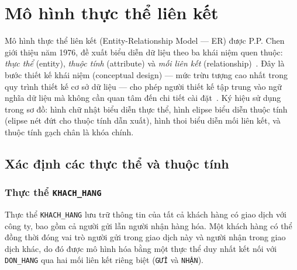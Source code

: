 \documentclass[11pt]{report}
\begin{document}

\chapter{Mô hình thực thể liên kết}
\label{chap:erd}

Mô hình thực thể liên kết (Entity-Relationship Model --- ER) được P.P. Chen giới thiệu năm 1976, đề xuất biểu diễn dữ liệu theo ba khái niệm quen thuộc: \textit{thực thể} (entity), \textit{thuộc tính} (attribute) và \textit{mối liên kết} (relationship)~\cite{chen1976entity}. Đây là bước thiết kế khái niệm (conceptual design) --- mức trừu tượng cao nhất trong quy trình thiết kế cơ sở dữ liệu --- cho phép người thiết kế tập trung vào ngữ nghĩa dữ liệu mà không cần quan tâm đến chi tiết cài đặt~\cite{elmasri2015fundamentals}. Ký hiệu sử dụng trong sơ đồ: hình chữ nhật biểu diễn thực thể, hình elipse biểu diễn thuộc tính (elipse nét đứt cho thuộc tính dẫn xuất), hình thoi biểu diễn mối liên kết, và thuộc tính gạch chân là khóa chính.


\section{Xác định các thực thể và thuộc tính}
\label{sec:thucthe_thuoctinh}


\subsection{Thực thể \texttt{KHACH\_HANG}}
\label{subsec:enti-kh}

Thực thể \texttt{KHACH\_HANG} lưu trữ thông tin của tất cả khách hàng có giao dịch với công ty, bao gồm cả người gửi lẫn người nhận hàng hóa. Một khách hàng có thể đồng thời đóng vai trò người gửi trong giao dịch này và người nhận trong giao dịch khác, do đó được mô hình hóa bằng một thực thể duy nhất kết nối với \texttt{DON\_HANG} qua hai mối liên kết riêng biệt (\texttt{GỬI} và \texttt{NHẬN}).
\end{document}
